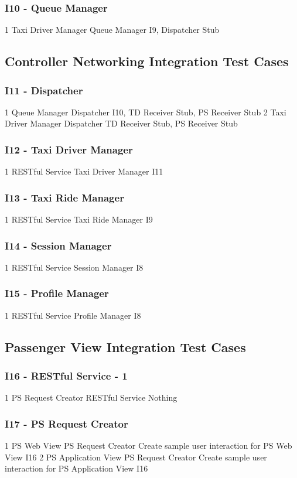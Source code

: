 \subsubsection{I10 - Queue Manager}
\testCaseStdInOut
	{1}
	{Taxi Driver Manager}
	{Queue Manager}
	{I9, Dispatcher Stub}
\subsection{Controller Networking Integration Test Cases}
\subsubsection{I11 - Dispatcher}
\testCaseStdInOut
	{1}
	{Queue Manager}
	{Dispatcher}
	{I10, TD Receiver Stub, PS Receiver Stub}
\testCaseStdInOut
	{2}
	{Taxi Driver Manager}
	{Dispatcher}
	{TD Receiver Stub, PS Receiver Stub}
\subsubsection{I12 - Taxi Driver Manager}
\testCaseStdInOut
	{1}
	{RESTful Service}
	{Taxi Driver Manager}
	{I11}
\subsubsection{I13 - Taxi Ride Manager}
\testCaseStdInOut
	{1}
	{RESTful Service}
	{Taxi Ride Manager}
	{I9}
\subsubsection{I14 - Session Manager}
\testCaseStdInOut
	{1}
	{RESTful Service}
	{Session Manager}
	{I8}
\subsubsection{I15 - Profile Manager}
\testCaseStdInOut
	{1}
	{RESTful Service}
	{Profile Manager}
	{I8}
\subsection{Passenger View Integration Test Cases}
\subsubsection{I16 - RESTful Service - 1}
\testCaseStdInOut
	{1}
	{PS Request Creator}
	{RESTful Service}
	{Nothing}
\subsubsection{I17 - PS Request Creator}
\testCaseStdOut
	{1}
	{PS Web View}
	{PS Request Creator}
	{Create sample user interaction for PS Web View}
	{I16}
\testCaseStdOut
	{2}
	{PS Application View}
	{PS Request Creator}
	{Create sample user interaction for PS Application View}	
	{I16}
